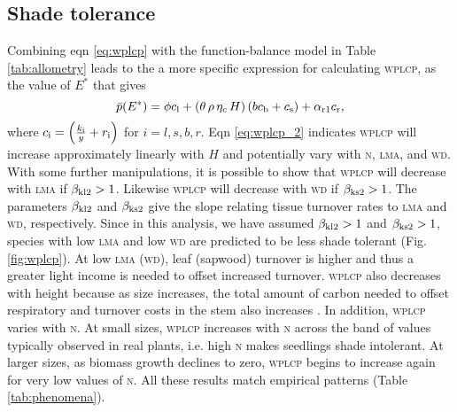 \documentclass[9pt,twocolumn,twoside,lineno]{pnas-new}
\newcommand{\wplcp}{\textsc{wplcp}}
\newcommand{\lma}{\textsc{lma}}
\newcommand{\wood}{\textsc{wd}}
\newcommand{\nitrogen}{\textsc{n}}
\begin{document}
\subsection*{Shade tolerance}
Combining eqn \ref{eq:wplcp} with the function-balance model in Table \ref{tab:allometry} leads to the a more specific expression for calculating {\wplcp}, as the value of $E^*$ that gives
\begin{equation}\label{eq:wplcp_2}
\bar{p}(E^*) =
      \phi c_{\rm l} +
      \left(\theta \, \rho \, \eta_c \, H\right)
        \left(b c_{\rm b}
            + c_{\rm s}\right) +
      \alpha_{\rm r1} c_{\rm r},
\end{equation}
where $c_{\rm i} = \left(\frac{k_{\rm i}}{y} + r_{\rm i}\right)$ for $i=l,s,b,r$.
Eqn \ref{eq:wplcp_2} indicates {\wplcp} will increase approximately linearly with $H$ and potentially vary with {\nitrogen}, {\lma}, and {\wood}. With some further manipulations, it is possible to show that {\wplcp} will decrease with {\lma} if $\beta_{{\rm kl2}} >1$. Likewise {\wplcp} will decrease with {\wood} if $\beta_{{\rm ks2}} >1$. The parameters $\beta_{{\rm kl2}}$ and $\beta_{{\rm ks2}}$ give the slope relating tissue turnover rates to {\lma} and {\wood}, respectively. Since in this analysis, we have assumed $\beta_{{\rm kl2}} >1$ and $\beta_{{\rm ks2}} >1$, species with low {\lma} and low {\wood} are predicted to be less shade tolerant (Fig. \ref{fig:wplcp}). At low {\lma} ({\wood}), leaf (sapwood) turnover is higher and thus a greater light income is needed to offset increased turnover. {\wplcp} also decreases with height because as size increases, the total amount of carbon needed to offset respiratory and turnover costs in the stem also increases \citep{Givnish-1988}. In addition, {\wplcp} varies with {\nitrogen}. At small sizes, {\wplcp} increases with {\nitrogen} across the band of values typically observed in real plants, i.e. high {\nitrogen} makes seedlings shade intolerant. At larger sizes, as biomass growth declines to zero, {\wplcp} begins to increase again for very low values of {\nitrogen}. All these results  match empirical patterns (Table \ref{tab:phenomena}).


\newcommand{\sepp}{{\color{grey}/}}
\newcommand{\upup}{$\uparrow\,\uparrow$}
\newcommand{\updo}{$\uparrow\,\downarrow$}
\newcommand{\dodo}{$\downarrow\,\downarrow$}
\newcommand{\upfl}{$\uparrow$\,--}
\newcommand{\flup}{--$\,\uparrow$}
\newcommand{\dofl}{$\downarrow\,$--}
\newcommand{\doup}{$\downarrow\,\uparrow$}
\newcommand{\fldo}{--$\,\downarrow$}
\end{document}

